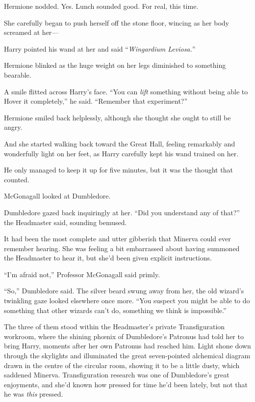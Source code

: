 Hermione nodded. Yes. Lunch sounded good. For real, this time.

She carefully began to push herself off the stone floor, wincing as her body screamed at her—

Harry pointed his wand at her and said “\emph{Wingardium Leviosa.}”

Hermione blinked as the huge weight on her legs diminished to something bearable.

A smile flitted across Harry’s face. “You can \emph{lift} something without being able to Hover it completely,” he said. “Remember that experiment?”

Hermione smiled back helplessly, although she thought she ought to still be angry.

And she started walking back toward the Great Hall, feeling remarkably and wonderfully light on her feet, as Harry carefully kept his wand trained on her.

He only managed to keep it up for five minutes, but it was the thought that counted.

\later

McGonagall looked at Dumbledore.

Dumbledore gazed back inquiringly at her. “Did you understand any of that?” the Headmaster said, sounding bemused.

It had been the most complete and utter gibberish that Minerva could ever remember hearing. She was feeling a bit embarrassed about having summoned the Headmaster to hear it, but she’d been given explicit instructions.

“I’m afraid not,” Professor McGonagall said primly.

“So,” Dumbledore said. The silver beard swung away from her, the old wizard’s twinkling gaze looked elsewhere once more. “You suspect you might be able to do something that other wizards can’t do, something we think is impossible.”

The three of them stood within the Headmaster’s private Transfiguration workroom, where the shining phœnix of Dumbledore’s Patronus had told her to bring Harry, moments after her own Patronus had reached him. Light shone down through the skylights and illuminated the great seven-pointed alchemical diagram drawn in the centre of the circular room, showing it to be a little dusty, which saddened Minerva. Transfiguration research was one of Dumbledore’s great enjoyments, and she’d known how pressed for time he’d been lately, but not that he was \emph{this} pressed.

